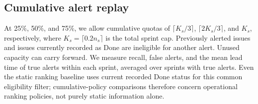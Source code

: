 \subsection{Cumulative alert replay}\label{cumulative-alert-replay}

At 25\%, 50\%, and 75\%, we allow cumulative quotas of \(\lceil K_s/3\rceil\), \(\lceil2K_s/3\rceil\), and \(K_s\), respectively, where \(K_s=\lceil0.2n_s\rceil\) is the total sprint cap. Previously alerted issues and issues currently recorded as Done are ineligible for another alert. Unused capacity can carry forward. We measure recall, false alerts, and the mean lead time of true alerts within each sprint, averaged over sprints with true alerts. Even the static ranking baseline uses current recorded Done status for this common eligibility filter; cumulative-policy comparisons therefore concern operational ranking policies, not purely static information alone.

